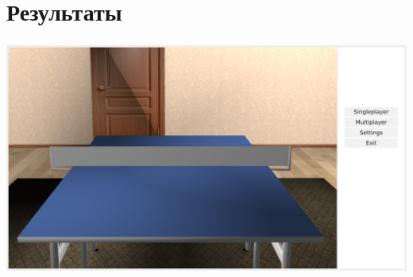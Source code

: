 \section{Результаты}

\begin{frame}
\frametitle{\insertsection} 
\includegraphics[width=\linewidth]{rez.png}
\end{frame}